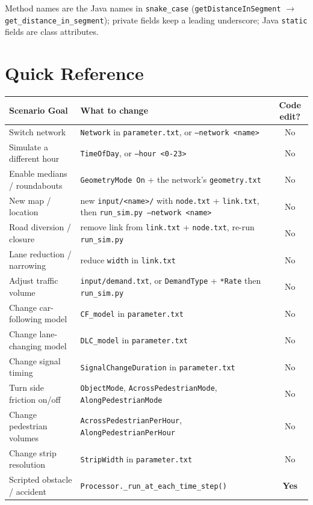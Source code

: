 \documentclass[11pt, a4paper]{article}
\newcommand{\code}[1]{\texttt{#1}}
\begin{document}
Method names are the Java names in \code{snake\_case}
(\code{getDistanceInSegment} $\rightarrow$ \code{get\_distance\_in\_segment});
private fields keep a leading underscore; Java \code{static} fields are class
attributes.

\section{Quick Reference}

\begin{table}[h!]
\centering
\begin{tabularx}{\textwidth}{l X c}
\toprule
\textbf{Scenario Goal} & \textbf{What to change} & \textbf{Code edit?} \\
\midrule
Switch network & \code{Network} in \code{parameter.txt}, or \code{--network <name>} & No \\
Simulate a different hour & \code{TimeOfDay}, or \code{--hour <0-23>} & No \\
Enable medians / roundabouts & \code{GeometryMode On} + the network's \code{geometry.txt} & No \\
New map / location & new \code{input/<name>/} with \code{node.txt} + \code{link.txt}, then \code{run\_sim.py --network <name>} & No \\
Road diversion / closure & remove link from \code{link.txt} + \code{node.txt}, re-run \code{run\_sim.py} & No \\
Lane reduction / narrowing & reduce \code{width} in \code{link.txt} & No \\
Adjust traffic volume & \code{input/demand.txt}, or \code{DemandType} + \code{*Rate} then \code{run\_sim.py} & No \\
Change car-following model & \code{CF\_model} in \code{parameter.txt} & No \\
Change lane-changing model & \code{DLC\_model} in \code{parameter.txt} & No \\
Change signal timing & \code{SignalChangeDuration} in \code{parameter.txt} & No \\
Turn side friction on/off & \code{ObjectMode}, \code{AcrossPedestrianMode}, \code{AlongPedestrianMode} & No \\
Change pedestrian volumes & \code{AcrossPedestrianPerHour}, \code{AlongPedestrianPerHour} & No \\
Change strip resolution & \code{StripWidth} in \code{parameter.txt} & No \\
Scripted obstacle / accident & \code{Processor.\_run\_at\_each\_time\_step()} & \textbf{Yes} \\

\end{tabularx}
\end{table}
\end{document}
